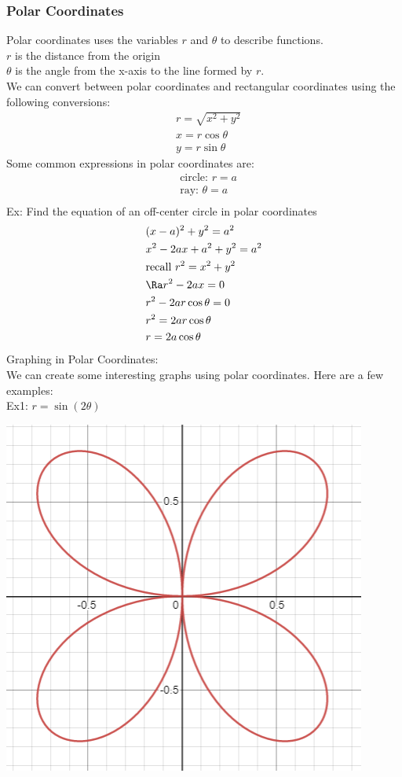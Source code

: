 \subsubsection{Polar Coordinates}
Polar coordinates uses the variables $r$ and $\theta$ to describe functions.\\
$r$ is the distance from the origin\\
$\theta$ is the angle from the x-axis to the line formed by $r$.\\
We can convert between polar coordinates and rectangular coordinates using the following conversions:
\begin{align*}
    &r=\sqrt{x^2+y^2}\\
    &x=r\cos\theta\\
    &y=r\sin\theta
\end{align*}
Some common expressions in polar coordinates are:
\begin{align*}
    &\text{circle: }r=a\\
    &\text{ray: }\theta=a\\
\end{align*}
Ex: Find the equation of an off-center circle in polar coordinates
\begin{align*}
    &(x-a)^2+y^2=a^2\\
    &x^2-2ax+a^2+y^2=a^2\\
    &\text{recall }r^2=x^2+y^2\\
    &\Ra r^2-2ax=0\\
    &r^2-2ar\cos\theta=0\\
    &r^2=2ar\cos\theta\\
    &r=2a\cos\theta
\end{align*}
Graphing in Polar Coordinates:\\
We can create some interesting graphs using polar coordinates. Here are a few examples:\\
Ex1: $r=\sin(2\theta)$\\
\centerline{\includegraphics[scale=0.7]{Images/PreCalcPictures/PolarGraph1.png}}
